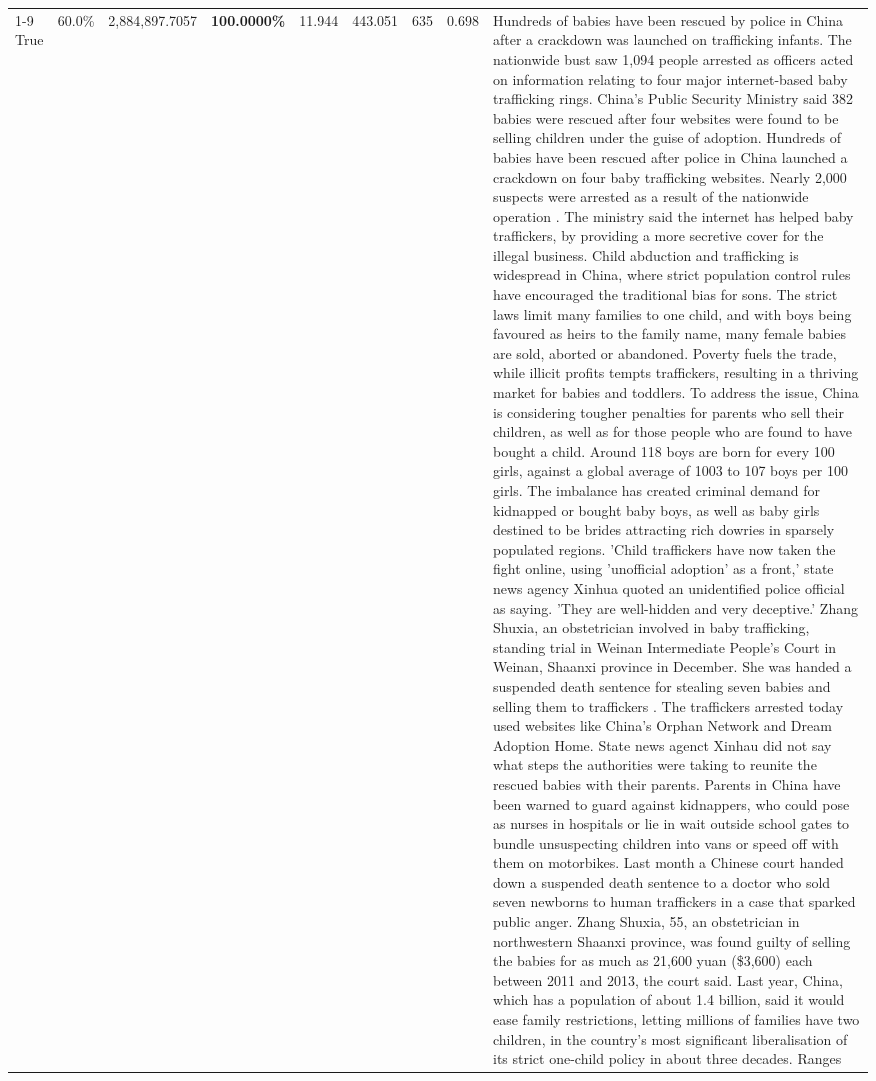 \begin{table}[H]
\begin{tabular}{lllrlllll}
\cline{1-9}
True & 60.0\% & 2,884,897.7057 & \bfseries \color{red} 100.0000\% & 11.944 & 443.051 & 635 & 0.698 & Hundreds of babies have been rescued by police in China after a crackdown was launched on trafficking infants. The nationwide bust saw 1,094 people arrested as officers acted on information relating to four major internet-based baby trafficking rings. China's Public Security Ministry said 382 babies were rescued after four websites were found to be selling children under the guise of adoption. Hundreds of babies have been rescued after police in China launched a crackdown on four baby trafficking websites. Nearly 2,000 suspects were arrested as a result of the nationwide operation . The ministry said the internet has helped baby traffickers, by providing a more secretive cover for the illegal business. Child abduction and trafficking is widespread in China, where strict population control rules have encouraged the traditional bias for sons. The strict laws limit many families to one child, and with boys being favoured as heirs to the family name, many female babies are sold, aborted or abandoned. Poverty fuels the trade, while illicit profits tempts traffickers, resulting in a thriving market for babies and toddlers. To address the issue, China is considering tougher penalties for parents who sell their children, as well as for those people who are found to have bought a child. Around 118 boys are born for every 100 girls, against a global average of 1003 to 107 boys per 100 girls. The imbalance has created criminal demand for kidnapped or bought baby boys, as well as baby girls destined to be brides attracting rich dowries in sparsely populated regions. 'Child traffickers have now taken the fight online, using 'unofficial adoption' as a front,' state news agency Xinhua quoted an unidentified police official as saying. 'They are well-hidden and very deceptive.' Zhang Shuxia, an obstetrician involved in baby trafficking, standing trial in Weinan Intermediate People's Court in Weinan, Shaanxi province in December. She was handed a suspended death sentence for stealing seven babies and selling them to traffickers . The traffickers arrested today used websites like China's Orphan Network and Dream Adoption Home. State news agenct Xinhau did not say what steps the authorities were taking to reunite the rescued babies with their parents. Parents in China have been warned to guard against kidnappers, who could pose as nurses in hospitals or lie in wait outside school gates to bundle unsuspecting children into vans or speed off with them on motorbikes. Last month a Chinese court handed down a suspended death sentence to a doctor who sold seven newborns to human traffickers in a case that sparked public anger. Zhang Shuxia, 55, an obstetrician in northwestern Shaanxi province, was found guilty of selling the babies for as much as 21,600 yuan (\$3,600) each between 2011 and 2013, the court said. Last year, China, which has a population of about 1.4 billion, said it would ease family restrictions, letting millions of families have two children, in the country's most significant liberalisation of its strict one-child policy in about three decades. Ranges \\

\end{tabular}
\end{table}
